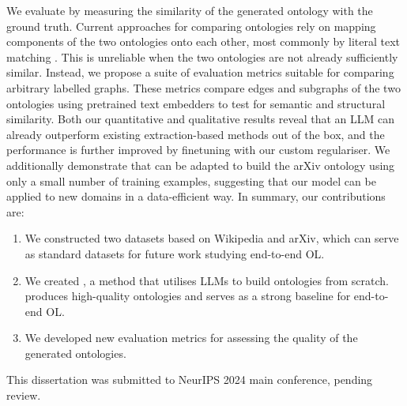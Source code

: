 We evaluate \name by measuring the similarity of the generated ontology with the ground truth. Current approaches for comparing ontologies rely on mapping components of the two ontologies onto each other, most commonly by literal text matching \cite{maedche2002measuring,Treeratpituk2013GraphbasedAT}. This is unreliable when the two ontologies are not already sufficiently similar. Instead, we propose a suite of evaluation metrics suitable for comparing arbitrary labelled graphs. These metrics compare edges and subgraphs of the two ontologies using pretrained text embedders to test for semantic and structural similarity. Both our quantitative and qualitative results reveal that an LLM can already outperform existing extraction-based methods out of the box, and the performance is further improved by finetuning with our custom regulariser. We additionally demonstrate that \name can be adapted to build the arXiv ontology using only a small number of training examples, suggesting that our model can be applied to new domains in a data-efficient way. In summary, our contributions are:
\begin{enumerate}[leftmargin=*]
    \item We constructed two datasets based on Wikipedia and arXiv, which can serve as standard datasets for future work studying end-to-end OL.
    \item We created \name, a method that utilises LLMs to build ontologies from scratch. \name produces high-quality ontologies and serves as a strong baseline for end-to-end OL.
    \item We developed new evaluation metrics for assessing the quality of the generated ontologies.
\end{enumerate}

This dissertation was submitted to NeurIPS 2024 main conference, pending review.
